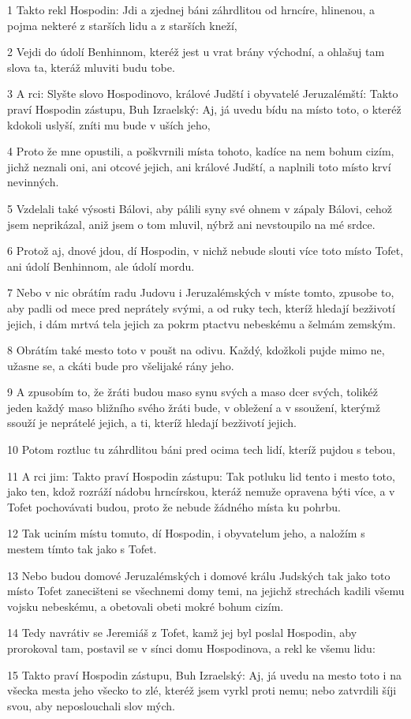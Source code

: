 \par 1 Takto rekl Hospodin: Jdi a zjednej báni záhrdlitou od hrncíre, hlinenou, a pojma nekteré z starších lidu a z starších kneží,
\par 2 Vejdi do údolí Benhinnom, kteréž jest u vrat brány východní, a ohlašuj tam slova ta, kteráž mluviti budu tobe.
\par 3 A rci: Slyšte slovo Hospodinovo, králové Judští i obyvatelé Jeruzalémští: Takto praví Hospodin zástupu, Buh Izraelský: Aj, já uvedu bídu na místo toto, o kteréž kdokoli uslyší, zníti mu bude v uších jeho,
\par 4 Proto že mne opustili, a poškvrnili místa tohoto, kadíce na nem bohum cizím, jichž neznali oni, ani otcové jejich, ani králové Judští, a naplnili toto místo krví nevinných.
\par 5 Vzdelali také výsosti Bálovi, aby pálili syny své ohnem v zápaly Bálovi, cehož jsem neprikázal, aniž jsem o tom mluvil, nýbrž ani nevstoupilo na mé srdce.
\par 6 Protož aj, dnové jdou, dí Hospodin, v nichž nebude slouti více toto místo Tofet, ani údolí Benhinnom, ale údolí mordu.
\par 7 Nebo v nic obrátím radu Judovu i Jeruzalémských v míste tomto, zpusobe to, aby padli od mece pred neprátely svými, a od ruky tech, kteríž hledají bezživotí jejich, i dám mrtvá tela jejich za pokrm ptactvu nebeskému a šelmám zemským.
\par 8 Obrátím také mesto toto v poušt na odivu. Každý, kdožkoli pujde mimo ne, užasne se, a ckáti bude pro všelijaké rány jeho.
\par 9 A zpusobím to, že žráti budou maso synu svých a maso dcer svých, tolikéž jeden každý maso bližního svého žráti bude, v obležení a v ssoužení, kterýmž ssouží je neprátelé jejich, a ti, kteríž hledají bezživotí jejich.
\par 10 Potom roztluc tu záhrdlitou báni pred ocima tech lidí, kteríž pujdou s tebou,
\par 11 A rci jim: Takto praví Hospodin zástupu: Tak potluku lid tento i mesto toto, jako ten, kdož rozráží nádobu hrncírskou, kteráž nemuže opravena býti více, a v Tofet pochovávati budou, proto že nebude žádného místa ku pohrbu.
\par 12 Tak uciním místu tomuto, dí Hospodin, i obyvatelum jeho, a naložím s mestem tímto tak jako s Tofet.
\par 13 Nebo budou domové Jeruzalémských i domové králu Judských tak jako toto místo Tofet zanecišteni se všechnemi domy temi, na jejichž strechách kadili všemu vojsku nebeskému, a obetovali obeti mokré bohum cizím.
\par 14 Tedy navrátiv se Jeremiáš z Tofet, kamž jej byl poslal Hospodin, aby prorokoval tam, postavil se v sínci domu Hospodinova, a rekl ke všemu lidu:
\par 15 Takto praví Hospodin zástupu, Buh Izraelský: Aj, já uvedu na mesto toto i na všecka mesta jeho všecko to zlé, kteréž jsem vyrkl proti nemu; nebo zatvrdili šíji svou, aby neposlouchali slov mých.

